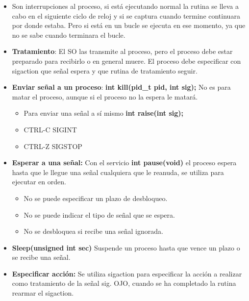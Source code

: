 \documentclass[12pt, twoside, openright]{report} %
\begin{document}
  \begin{itemize}
  \item Son interrupciones al proceso, si está ejecutando normal la rutina
    se lleva a cabo en el siguiente ciclo de reloj y si se captura
    cuando termine continuara por donde estaba. Pero si está en un bucle
    se ejecuta en ese momento, ya que no se sabe cuando terminara el
    bucle.
    
  \item \textbf{Tratamiento}: El SO las transmite al proceso, pero el
    proceso debe estar preparado para recibirlo o en general muere. El
    proceso debe especificar con sigaction que señal espera y que rutina
    de tratamiento seguir.
    
  \item \textbf{Enviar señal a un proceso}: \textbf{int kill(pid\_t pid, int
    sig);} No es para matar el proceso, aunque si el proceso no la
    espera le matará.
    

    \begin{itemize}
    \item Para enviar una señal a sí mismo \textbf{int raise(int sig);}
      
    \item CTRL-C SIGINT
      
    \item CTRL-Z SIGSTOP
      
    \end{itemize}
  \item \textbf{Esperar a una señal:} Con el servicio \textbf{int
    pause(void)} el proceso espera hasta que le llegue una señal
    cualquiera que le reanuda, se utiliza para ejecutar en orden.
    

    \begin{itemize}
    \item No se puede especificar un plazo de desbloqueo.
      
    \item No se puede indicar el tipo de señal que se espera.
      
    \item No se desbloquea si recibe una señal ignorada.
      
    \end{itemize}
  \item \textbf{Sleep(unsigned int sec)} Suspende un proceso hasta que vence
    un plazo o se recibe una señal.
    
  \item \textbf{Especificar acción:} Se utiliza sigaction para especificar
    la acción a realizar como tratamiento de la señal sig. OJO, cuando
    se ha completado la rutina rearmar el sigaction.
    


\end{itemize}
\end{document}
